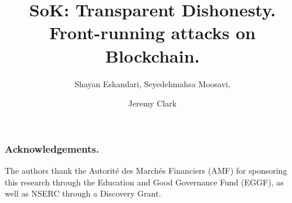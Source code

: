 \documentclass[envcountsect]{llncs}
\begin{document}
\frontmatter
\mainmatter

\title{SoK: Transparent Dishonesty. Front-running attacks on Blockchain. }
\author{Shayan Eskandari, Seyedehmahsa Moosavi, \and Jeremy Clark}

	
\maketitle








\subsubsection*{Acknowledgements.}
The authors thank the Autorit\'e des March\'es Financiers (AMF) for sponsoring this research through the Education and Good Governance Fund (EGGF), as well as NSERC through a Discovery Grant. 


\clearpage




\end{document}
